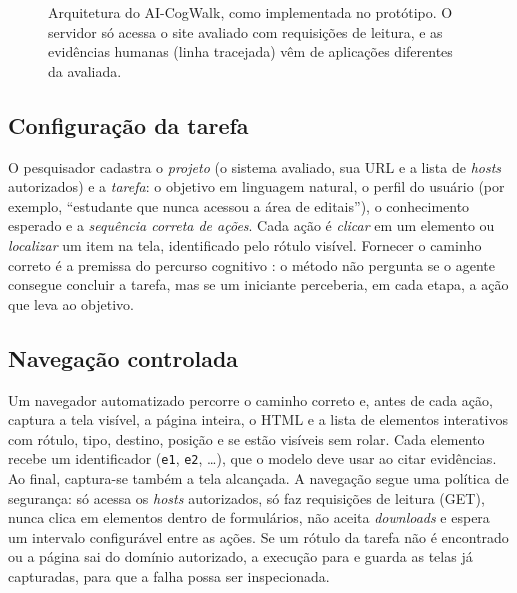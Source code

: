 \documentclass[12pt]{article}
\newcommand{\code}[1]{\texttt{#1}}
\newcommand{\proj}{AI-CogWalk}
\begin{document}
\begin{figure}[!ht]
{}
\caption{Arquitetura do \proj, como implementada no protótipo. O servidor só acessa o site avaliado com requisições de leitura, e as evidências humanas (linha tracejada) vêm de aplicações diferentes da avaliada.}
\label{fig:arquitetura}
\end{figure}

\subsection{Configuração da tarefa}

O pesquisador cadastra o \textit{projeto} (o sistema avaliado, sua URL e a lista de \textit{hosts} autorizados) e a \textit{tarefa}: o objetivo em linguagem natural, o perfil do usuário (por exemplo, ``estudante que nunca acessou a área de editais''), o conhecimento esperado e a \textit{sequência correta de ações}. Cada ação é \textit{clicar} em um elemento ou \textit{localizar} um item na tela, identificado pelo rótulo visível. Fornecer o caminho correto é a premissa do percurso cognitivo \cite{wharton1994cw}: o método não pergunta se o agente consegue concluir a tarefa, mas se um iniciante perceberia, em cada etapa, a ação que leva ao objetivo.

\subsection{Navegação controlada}

Um navegador automatizado percorre o caminho correto e, antes de cada ação, captura a tela visível, a página inteira, o HTML e a lista de elementos interativos com rótulo, tipo, destino, posição e se estão visíveis sem rolar. Cada elemento recebe um identificador (\code{e1}, \code{e2}, \ldots), que o modelo deve usar ao citar evidências. Ao final, captura-se também a tela alcançada. A navegação segue uma política de segurança: só acessa os \textit{hosts} autorizados, só faz requisições de leitura (GET), nunca clica em elementos dentro de formulários, não aceita \textit{downloads} e espera um intervalo configurável entre as ações. Se um rótulo da tarefa não é encontrado ou a página sai do domínio autorizado, a execução para e guarda as telas já capturadas, para que a falha possa ser inspecionada.
\end{document}
